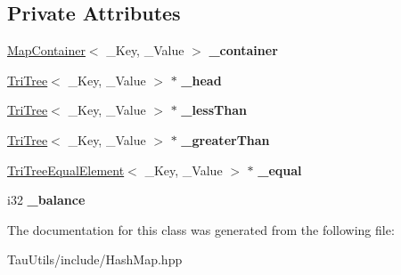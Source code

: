 \subsection*{Private Attributes}
\begin{DoxyCompactItemize}
\item 
\mbox{\label{class_tri_tree_a999c341621dcf1440b31a328d2cfb310}} 
\mbox{\hyperlink{struct_map_container}{Map\+Container}}$<$ \+\_\+\+Key, \+\_\+\+Value $>$ {\bfseries \+\_\+container}
\item 
\mbox{\label{class_tri_tree_a877cafd66d392b94eaf243c8fce32bb0}} 
\mbox{\hyperlink{class_tri_tree}{Tri\+Tree}}$<$ \+\_\+\+Key, \+\_\+\+Value $>$ $\ast$ {\bfseries \+\_\+head}
\item 
\mbox{\label{class_tri_tree_a4ff2bdcca2c35ca5c3ac0103dde4da20}} 
\mbox{\hyperlink{class_tri_tree}{Tri\+Tree}}$<$ \+\_\+\+Key, \+\_\+\+Value $>$ $\ast$ {\bfseries \+\_\+less\+Than}
\item 
\mbox{\label{class_tri_tree_a7207d4424a319a5b0843683b6ed1d57d}} 
\mbox{\hyperlink{class_tri_tree}{Tri\+Tree}}$<$ \+\_\+\+Key, \+\_\+\+Value $>$ $\ast$ {\bfseries \+\_\+greater\+Than}
\item 
\mbox{\label{class_tri_tree_a0f7ea126ee849bf6ad88700c294d427f}} 
\mbox{\hyperlink{class_tri_tree_equal_element}{Tri\+Tree\+Equal\+Element}}$<$ \+\_\+\+Key, \+\_\+\+Value $>$ $\ast$ {\bfseries \+\_\+equal}
\item 
\mbox{\label{class_tri_tree_a36b239c302760c59a91f6b7a10a66b37}} 
i32 {\bfseries \+\_\+balance}
\end{DoxyCompactItemize}


The documentation for this class was generated from the following file\+:\begin{DoxyCompactItemize}
\item 
Tau\+Utils/include/Hash\+Map.\+hpp\end{DoxyCompactItemize}
